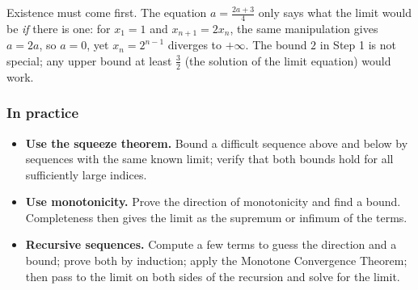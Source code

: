 Existence must come first. The equation $a=\frac{2a+3}{4}$ only says what the limit would be \emph{if} there is one: for $x_1=1$ and $x_{n+1}=2x_n$, the same manipulation gives $a=2a$, so $a=0$, yet $x_n=2^{n-1}$ diverges to $+\infty$. The bound $2$ in Step 1 is not special; any upper bound at least $\frac32$ (the solution of the limit equation) would work.

\subsubsection*{In practice}
\begin{itemize}
    \item \textbf{Use the squeeze theorem.} Bound a difficult sequence above and below by sequences with the same known limit; verify that both bounds hold for all sufficiently large indices.
    \item \textbf{Use monotonicity.} Prove the direction of monotonicity and find a bound. Completeness then gives the limit as the supremum or infimum of the terms.
    \item \textbf{Recursive sequences.} Compute a few terms to guess the direction and a bound; prove both by induction; apply the Monotone Convergence Theorem; then pass to the limit on both sides of the recursion and solve for the limit.
\end{itemize}
